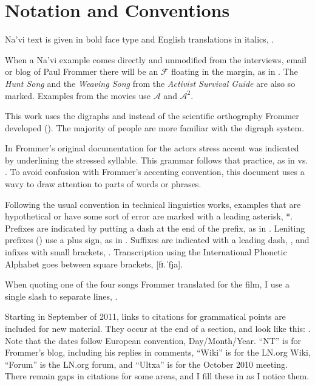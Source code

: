 \section{Notation and Conventions}

Na'vi text is given in bold face type and English translations in
italics,  .

When a Na'vi example comes directly and unmodified from the
interviews, email or blog of Paul Frommer there will be an
$\mathcal{F}$ floating in the margin, as in .  The
\textit{Hunt Song} and the \textit{Weaving Song} from the
\textit{Activist Survival Guide} are also so marked.  Examples from
the movies use $\mathcal{A}$ and $\mathcal{A}^2$.

This work uses the digraphs  and  instead of the
scientific orthography Frommer developed ().  The
majority of people are more familiar with the digraph system.

In Frommer's original documentation for the actors stress accent was
indicated by underlining the stressed syllable.  This grammar follows
that practice, as in   vs. 
.  To avoid confusion with Frommer's accenting convention,
this document uses a wavy  to draw attention to parts
of words or phrases.

Following the usual convention in technical linguistics works,
examples that are hypothetical or have some sort of error are marked
with a leading asterisk, *.  Prefixes are indicated by
putting a dash at the end of the prefix, as in .  Leniting
prefixes () use a plus sign, as in .
Suffixes are indicated with a leading dash, , and infixes with
small brackets, .  Transcription using the International
Phonetic Alphabet goes between square brackets, [fɪ.ˈfja].

When quoting one of the four songs Frommer translated for the film, I
use a single slash to separate lines, .

Starting in September of 2011, links to citations for grammatical
points are included for new material.  They occur at the end of a
section, and look like this:
.
Note that the dates follow European convention, Day/Month/Year.
``NT'' is for Frommer's blog, including his replies in comments,
``Wiki'' is for the LN.org Wiki, ``Forum'' is the LN.org forum, and
``Ultxa'' is for the October 2010 meeting.  There remain gaps in
citations for some areas, and I fill these in as I notice them.

